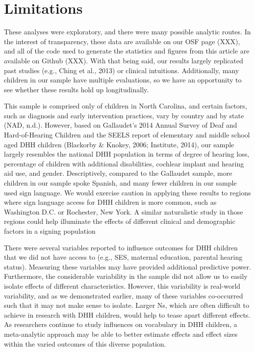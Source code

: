 \documentclass[english,man]{apa6}
\begin{document}
\hypertarget{limitations}{%
\section{Limitations}\label{limitations}}

These analyses were exploratory, and there were many possible analytic routes. In the interest of transparency, these data are available on our OSF page (XXX), and all of the code used to generate the statistics and figures from this article are available on Github (XXX). With that being said, our results largely replicated past studies (e.g., Ching et al., 2013) or clinical intuitions. Additionally, many children in our sample have multiple evaluations, so we have an opportunity to see whether these results hold up longitudinally.

This sample is comprised only of children in North Carolina, and certain factors, such as diagnosis and early intervention practices, vary by country and by state (NAD, n.d.). However, based on Gallaudet's 2014 Annual Survey of Deaf and Hard-of-Hearing Children and the SEELS report of elementary and middle school aged DHH children (Blackorby \& Knokey, 2006; Institute, 2014), our sample largely resembles the national DHH population in terms of degree of hearing loss, percentage of children with additional disabilities, cochlear implant and hearing aid use, and gender. Descriptively, compared to the Gallaudet sample, more children in our sample spoke Spanish, and many fewer children in our sample used sign language. We would exercise caution in applying these results to regions where sign language access for DHH children is more common, such as Washington D.C. or Rochester, New York. A similar naturalistic study in those regions could help illuminate the effects of different clinical and demographic factors in a signing population

There were several variables reported to influence outcomes for DHH children that we did not have access to (e.g., SES, maternal education, parental hearing status). Measuring these variables may have provided additional predictive power. Furthermore, the considerable variability in the sample did not allow us to easily isolate effects of different characteristics. However, this variability is real-world variability, and as we demonstrated earlier, many of these variables co-occurred such that it may not make sense to isolate. Larger Ns, which are often difficult to achieve in research with DHH children, would help to tease apart different effects. As researchers continue to study influences on vocabulary in DHH children, a meta-analytic approach may be able to better estimate effects and effect sizes within the varied outcomes of this diverse population.
\end{document}
